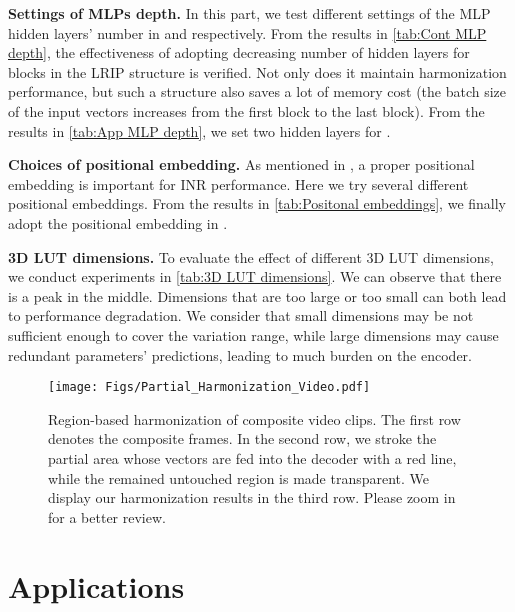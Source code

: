 \documentclass[10pt,journal,twocolumn,twoside]{IEEEtran}
\begin{document}
\textbf{Settings of MLPs depth.} In this part, we test different settings of the MLP hidden layers' number in  and  respectively. From the results in \cref{tab:Cont MLP depth}, the effectiveness of adopting decreasing number of hidden layers for blocks in the LRIP structure is verified. Not only does it maintain harmonization performance, but such a structure also saves a lot of memory cost (the batch size of the input vectors increases from the first block to the last block). From the results in \cref{tab:App MLP depth}, we set two hidden layers for .

\textbf{Choices of positional embedding.} As mentioned in \cite{mildenhall2021nerf, tancik2020fourier}, a proper positional embedding is important for INR performance. Here we try several different positional embeddings\cite{mildenhall2021nerf, tancik2020fourier, anokhin2021image, skorokhodov2021adversarial}. From the results in \cref{tab:Positonal embeddings}, we finally adopt the positional embedding in \cite{anokhin2021image}.

\textbf{3D LUT dimensions.} To evaluate the effect of different 3D LUT dimensions, we conduct experiments in \cref{tab:3D LUT dimensions}. We can observe that there is a peak in the middle. Dimensions that are too large or too small can both lead to performance degradation. We consider that small dimensions may be not sufficient enough to cover the variation range, while large dimensions may cause redundant parameters' predictions, leading to much burden on the encoder.

\begin{figure*}[t]
  \centering
   \texttt{[image: Figs/Partial\_Harmonization\_Video.pdf]}
   \caption{Region-based harmonization of composite video clips. The first row denotes the composite frames. In the second row, we stroke the partial area whose vectors are fed into the decoder with a red line, while the remained untouched region is made transparent. We display our harmonization results in the third row. Please zoom in for a better review.}
   \label{fig:Partial_Harmonization_Video}
\end{figure*}



\section{Applications}
\label{sec:usage}
\end{document}
